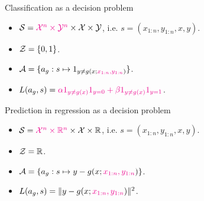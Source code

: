 \documentclass[10pt]{beamer}
\begin{document}
\begin{frame}{Classification as a decision problem }
  \begin{itemize}
    \item $\mathcal{S} = \textcolor{magenta}{\mathcal{X}^n\times\mathcal{Y}^n}\times \mathcal{X}\times \mathcal{Y}$, i.e. $s = (x_{1:n}, y_{1:n}, x, y)$.
    \item $\mathcal{Z} = \{0,1\}$.
    \item $\mathcal{A} = \{a_g: s\mapsto 1_{y\neq g(x; \textcolor{magenta}{x_{1:n}, y_{1:n}})}\}$.
    \item $L(a_g,s) = \textcolor{magenta}{\alpha 1_{y\neq g(x)} 1_{y = 0} + \beta 1_{y\neq g(x)} 1_{y = 1}}$.
    \end{itemize}
    \blank
    \vfill
\end{frame}

\begin{frame}{Prediction in regression as a decision problem}
\begin{itemize}
  \item $\mathcal{S} = \textcolor{magenta}{\mathcal{X}^n\times\mathbb{R}^n}\times \mathcal{X}\times \mathbb{R}$, i.e. $s = (x_{1:n}, y_{1:n}, x, y)$.
  \item $\mathcal{Z} = \mathbb{R}$.
  \item $\mathcal{A} = \{a_g: s\mapsto y - g(x; \textcolor{magenta}{x_{1:n}, y_{1:n}})\}$.
  \item $L(a_g,s) = \Vert y - g(x; \textcolor{magenta}{x_{1:n}, y_{1:n}}) \Vert^2$.
  \end{itemize}
  \blank
  \vfill
\end{frame}




\end{document}
